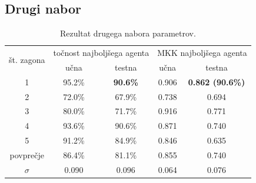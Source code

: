 \subsection{Drugi nabor}\label{subsec:dodatek-wine-drugi-nabor}
\begin{table}[H]
    \begin{center}
        \begin{tabular}{|| c | c c || c c ||}
            \hline
            \multirow{2}{*}{št. zagona} & \multicolumn{2}{c||}{točnost najboljšega agenta} & \multicolumn{2}{c||}{MKK najboljšega agenta} \\ \cline{2-5}
            & učna   & testna          & učna  & testna                  \\
            \hline
            1         & 95.2\% & \textbf{90.6\%} & 0.906 & \textbf{0.862 (90.6\%)} \\
            \hline
            2         & 72.0\% & 67.9\%          & 0.738 & 0.694                   \\
            \hline
            3         & 80.0\% & 71.7\%          & 0.916 & 0.771                   \\
            \hline
            4         & 93.6\% & 90.6\%          & 0.871 & 0.740                   \\
            \hline
            5         & 91.2\% & 84.9\%          & 0.846 & 0.635                   \\
            \hline
            povprečje & 86.4\% & 81.1\%          & 0.855 & 0.740                   \\
            \hline
            $\sigma$  & 0.090  & 0.096           & 0.064 & 0.076                   \\
            \hline
        \end{tabular}
    \end{center}
    \caption{Rezultat drugega nabora parametrov.}
    \label{tab:wine_result_2}
\end{table}

